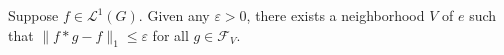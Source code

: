 \begin{lemma}
Suppose $f \in \mathcal{L}^1(G)$. Given any $\varepsilon > 0$, there exists a neighborhood $V$ of $e$ such that $\| f * g - f \|_1 \leq \varepsilon$ for all $g \in \mathcal{F}_V$.
\end{lemma}

